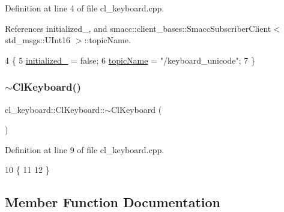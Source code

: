 Definition at line 4 of file cl\+\_\+keyboard.\+cpp.



References initialized\+\_\+, and smacc\+::client\+\_\+bases\+::\+Smacc\+Subscriber\+Client$<$ std\+\_\+msgs\+::\+U\+Int16 $>$\+::topic\+Name.


\begin{DoxyCode}
4                        \{
5   \hyperlink{classcl__keyboard_1_1ClKeyboard_a96128ed5180e0dc5cfe76c90a9f8e8f7}{initialized\_} = \textcolor{keyword}{false};
6   \hyperlink{classsmacc_1_1client__bases_1_1SmaccSubscriberClient_aeadf21a09412c6c9488e5acd50fb4f40}{topicName} = \textcolor{stringliteral}{"/keyboard\_unicode"};
7 \}
\end{DoxyCode}
\mbox{\label{classcl__keyboard_1_1ClKeyboard_af2f4ffb66639acb158d57d627a56d8e8}} 
\subsubsection{\texorpdfstring{$\sim$\+Cl\+Keyboard()}{~ClKeyboard()}}
{\footnotesize\ttfamily cl\+\_\+keyboard\+::\+Cl\+Keyboard\+::$\sim$\+Cl\+Keyboard (\begin{DoxyParamCaption}{ }\end{DoxyParamCaption})\hspace{0.3cm}{\ttfamily [virtual]}}



Definition at line 9 of file cl\+\_\+keyboard.\+cpp.


\begin{DoxyCode}
10 \{
11   
12 \}
\end{DoxyCode}


\subsection{Member Function Documentation}
\mbox{\label{classcl__keyboard_1_1ClKeyboard_a9e7061e65652a6a5b8ec34ba97e59195}} 

